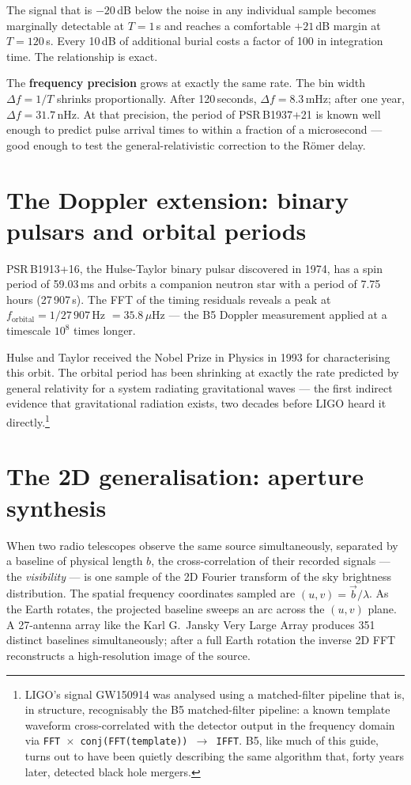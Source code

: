 \documentclass[11pt,a4paper,openany]{book}
\begin{document}
The signal that is $-20$\,dB below the noise in any individual sample becomes
marginally detectable at $T = 1$\,s and reaches a comfortable $+21$\,dB
margin at $T = 120$\,s. Every 10\,dB of additional burial costs a factor of
100 in integration time. The relationship is exact.

The \textbf{frequency precision} grows at exactly the same rate. The bin width
$\Delta f = 1/T$ shrinks proportionally. After 120\,seconds, $\Delta f = 8.3$\,mHz;
after one year, $\Delta f = 31.7$\,nHz. At that precision, the period of
PSR\,B1937+21 is known well enough to predict pulse arrival times to within a
fraction of a microsecond --- good enough to test the general-relativistic
correction to the R\"{o}mer delay.

\section{The Doppler extension: binary pulsars and orbital periods}

PSR\,B1913+16, the Hulse-Taylor binary pulsar discovered in 1974, has a spin
period of 59.03\,ms and orbits a companion neutron star with a period of
7.75\,hours (27\,907\,s). The FFT of the timing residuals reveals a peak at
$f_\mathrm{orbital} = 1/27\,907$\,Hz $= 35.8\,\mu$Hz --- the B5 Doppler
measurement applied at a timescale $10^8$ times longer.

Hulse and Taylor received the Nobel Prize in Physics in 1993 for characterising
this orbit. The orbital period has been shrinking at exactly the rate predicted
by general relativity for a system radiating gravitational waves --- the first
indirect evidence that gravitational radiation exists, two decades before LIGO
heard it directly.\footnote{LIGO's signal GW150914 was analysed using a
matched-filter pipeline that is, in structure, recognisably the B5
matched-filter pipeline: a known template waveform cross-correlated with the
detector output in the frequency domain via
\texttt{FFT $\times$ conj(FFT(template)) $\rightarrow$ IFFT}. B5, like much of
this guide, turns out to have been quietly describing the same algorithm that,
forty years later, detected black hole mergers.}

\section{The 2D generalisation: aperture synthesis}

When two radio telescopes observe the same source simultaneously, separated
by a baseline of physical length $b$, the cross-correlation of their recorded
signals --- the \emph{visibility} --- is one sample of the 2D Fourier transform
of the sky brightness distribution. The spatial frequency coordinates sampled
are $(u, v) = \vec{b}/\lambda$. As the Earth rotates, the projected baseline
sweeps an arc across the $(u,v)$ plane. A 27-antenna array like the Karl G.\
Jansky Very Large Array produces 351 distinct baselines simultaneously; after
a full Earth rotation the inverse 2D FFT reconstructs a high-resolution image
of the source.
\end{document}
